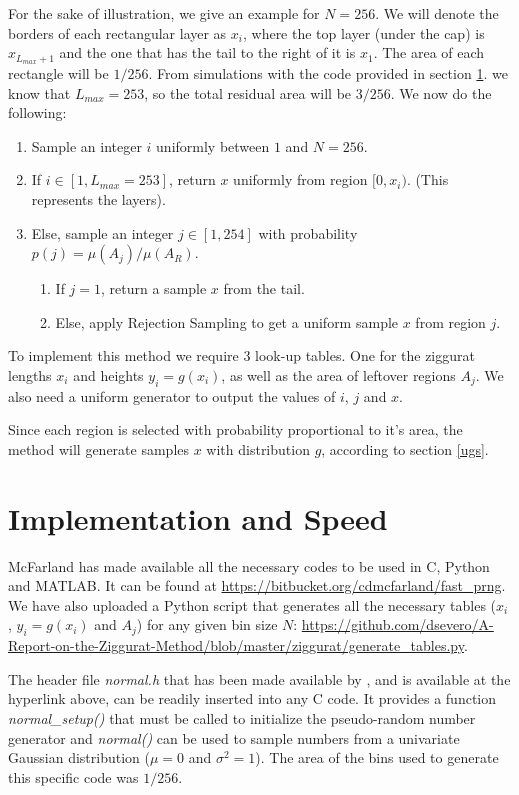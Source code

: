 \documentclass[11pt,onecolumn]{article}
\let\oldref\ref%
\def\ref{\oldref*}}
\begin{document}
For the sake of illustration, we give an example for $N=256$. We will denote the borders of each rectangular layer as $x_i$, where the top layer (under the cap) is $x_{L_{max}+1}$ and the one that has the tail to the right of it is $x_1$. The area of each rectangle will be $1/256$. From simulations with the code provided in section \ref{implementation}. we know that $L_{max}=253$, so the total residual area will be $3/256$. We now do the following:
\begin{enumerate}
	\item Sample an integer $i$ uniformly between $1$ and $N=256$.
	\item If $i\in[1,L_{max}=253]$, return $x$ uniformly from region $[0,x_i)$. (This represents the layers).
	\item Else, sample an integer $j\in[1,254]$ with probability $p(j)=\mu(A_j)/\mu(A_R)$.
	\begin{enumerate}
		\item If $j=1$, return a sample $x$ from the tail.
		\item Else, apply Rejection Sampling to get a uniform sample $x$ from region $j$.
	\end{enumerate}
\end{enumerate}

To implement this method we require 3 look-up tables. One for the ziggurat lengths $x_i$ and heights $y_i=g(x_i)$, as well as the area of leftover regions $A_j$. We also need a uniform generator to output the values of $i$, $j$ and $x$.

Since each region is selected with probability proportional to it's area, the method will generate samples $x$ with distribution $g$, according to section \ref{ugs}.

\section{Implementation and Speed}\label{implementation}
McFarland \cite{mcfarland2016modified} has made available all the necessary codes to be used in C, Python and MATLAB. It can be found at \url{https://bitbucket.org/cdmcfarland/fast_prng}. We have also uploaded a Python script that generates all the necessary tables ($x_i$, $y_i=g(x_i)$ and $A_j$) for any given bin size $N$: \url{https://github.com/dsevero/A-Report-on-the-Ziggurat-Method/blob/master/ziggurat/generate_tables.py}.

The header file \textit{normal.h} that has been made available by \cite{mcfarland2016modified}, and 
is available at the hyperlink above, can be readily inserted into any C code. It provides 
a function \textit{normal\_setup()} that must be called to initialize the pseudo-random
number generator and \textit{normal()} can be used to sample numbers from a univariate
Gaussian distribution ($\mu=0$ and $\sigma^2=1$). The area of the bins used to generate this specific code was $1/256$.
\end{document}
